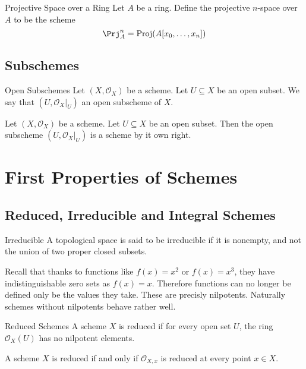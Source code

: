 \documentclass[a4paper]{article}
\begin{document}
\begin{defn}{Projective Space over a Ring}{} Let $A$ be a ring. Define the projective $n$-space over $A$ to be the scheme $$\Prj_A^n=\text{Proj}(A[x_0,\dots,x_n])$$
\end{defn}

\subsection{Subschemes}
\begin{defn}{Open Subschemes}{} Let $(X,\mathcal{O}_X)$ be a scheme. Let $U\subseteq X$ be an open subset. We say that $(U,\mathcal{O}_X|_U)$ an open subscheme of $X$. 
\end{defn}

\begin{prp}{}{} Let $(X,\mathcal{O}_X)$ be a scheme. Let $U\subseteq X$ be an open subset. Then the open subscheme $(U,\mathcal{O}_X|_U)$ is a scheme by it own right. 
\end{prp}



\pagebreak
\section{First Properties of Schemes}
\subsection{Reduced, Irreducible and Integral Schemes}
\begin{defn}{Irreducible}{} A topological space is said to be irreducible if it is nonempty, and not the union of two proper closed subsets. 
\end{defn}

Recall that thanks to functions like $f(x)=x^2$ or $f(x)=x^3$, they have indistinguishable zero sets as $f(x)=x$. Therefore functions can no longer be defined only be the values they take. These are precisly nilpotents. Naturally schemes without nilpotents behave rather well. 

\begin{defn}{Reduced Schemes}{} A scheme $X$ is reduced if for every open set $U$, the ring $\mathcal{O}_X(U)$ has no nilpotent elements. 
\end{defn}

\begin{prp}{}{} A scheme $X$ is reduced if and only if $\mathcal{O}_{X,x}$ is reduced at every point $x\in X$. 
\end{prp}
\end{document}
